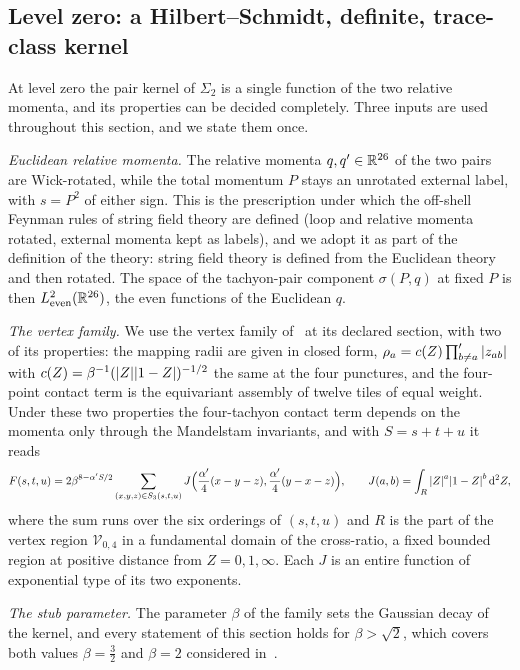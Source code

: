 

\subsection{Level zero: a Hilbert--Schmidt, definite, trace-class kernel}
\label{sec:mom:level-0}

At level zero the pair kernel of $\Sigma_2$ is a single function of the two relative momenta, and its properties can be decided completely.
Three inputs are used throughout this section, and we state them once.

\emph{Euclidean relative momenta.}
The relative momenta $q, q' \in \mathbb{R}^{26}$ of the two pairs are Wick-rotated, while the total momentum $P$ stays an unrotated external label, with $s = P^2$ of either sign.
This is the prescription under which the off-shell Feynman rules of string field theory are defined (loop and relative momenta rotated, external momenta kept as labels), and we adopt it as part of the definition of the theory: string field theory is defined from the Euclidean theory and then rotated.
The space of the tachyon-pair component $\sigma(P, q)$ at fixed $P$ is then $L^2_{\rm even}(\mathbb{R}^{26})$, the even functions of the Euclidean $q$.

\emph{The vertex family.}
We use the vertex family of~\cite{Erbin:2026:SL2CVerticesClosed} at its declared section, with two of its properties: the mapping radii are given in closed form, $\rho_a = c(Z) \prod'_{b \ne a} {|z_{ab}|}$ with $c(Z) = \beta^{-1} ({|Z|} {|1 - Z|})^{-1/2}$ the same at the four punctures, and the four-point contact term is the equivariant assembly of twelve tiles of equal weight.
Under these two properties the four-tachyon contact term depends on the momenta only through the Mandelstam invariants, and with $S = s + t + u$ it reads
\begin{equation}
  \label{eq:mom:F}
  F(s, t, u)
    = 2 \beta^{8 - \alpha' S / 2} \sum_{(x, y, z) \in S_3(s, t, u)} J\Big( \frac{\alpha'}{4} (x - y - z), \frac{\alpha'}{4} (y - x - z) \Big),
  \qquad
  J(a, b)
    = \int_R {|Z|}^{a} {|1 - Z|}^{b} \, \mathrm{d}^2 Z,
\end{equation}
where the sum runs over the six orderings of $(s, t, u)$ and $R$ is the part of the vertex region $\mathcal V_{0, 4}$ in a fundamental domain of the cross-ratio, a fixed bounded region at positive distance from $Z = 0, 1, \infty$.
Each $J$ is an entire function of exponential type of its two exponents.

\emph{The stub parameter.}
The parameter $\beta$ of the family sets the Gaussian decay of the kernel, and every statement of this section holds for $\beta > \sqrt{2}$, which covers both values $\beta = \tfrac{3}{2}$ and $\beta = 2$ considered in~\cite{Erbin:2026:SL2CVerticesClosed}.

